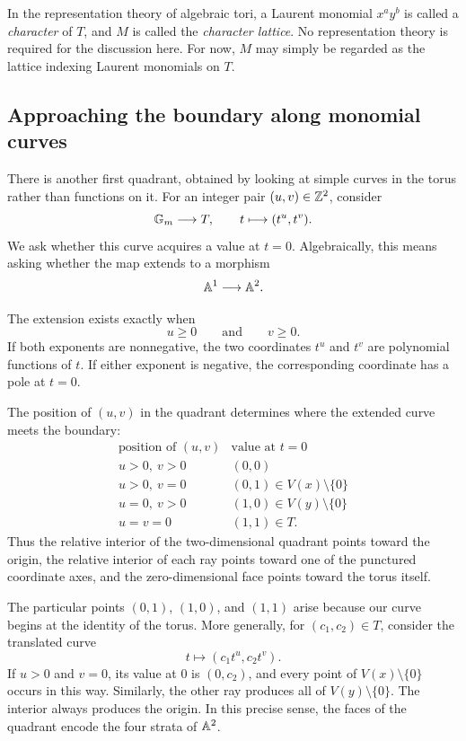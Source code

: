 \begin{observation}
In the representation theory of algebraic tori, a Laurent monomial
\(x^ay^b\) is called a \emph{character} of \(T\), and \(M\) is called
the \emph{character lattice}. No representation theory is required
for the discussion here. For now, \(M\) may simply be regarded as the
lattice indexing Laurent monomials on \(T\).
\end{observation}

\subsection{Approaching the boundary along monomial curves}

There is another first quadrant, obtained by looking at simple curves
in the torus rather than functions on it. For an integer pair
\((u,v)\in\mathbb{Z}^2\), consider
\[
\mathbb{G}_{m}\longrightarrow T,
\qquad
t\longmapsto(t^u,t^v).
\]
We ask whether this curve acquires a value at \(t=0\). Algebraically,
this means asking whether the map extends to a morphism
\[
\mathbb{A}^1\longrightarrow\mathbb{A}^2.
\]

The extension exists exactly when
\[
u\geq0
\qquad\text{and}\qquad
v\geq0.
\]
If both exponents are nonnegative, the two coordinates \(t^u\) and
\(t^v\) are polynomial functions of \(t\). If either exponent is
negative, the corresponding coordinate has a pole at \(t=0\).

The position of \((u,v)\) in the quadrant determines where the
extended curve meets the boundary:
\[
\begin{array}{c|c}
\text{position of }(u,v) & \text{value at }t=0\\
\hline
u>0,\ v>0 & (0,0)\\
u>0,\ v=0 & (0,1)\in V(x)\setminus\{0\}\\
u=0,\ v>0 & (1,0)\in V(y)\setminus\{0\}\\
u=v=0 & (1,1)\in T.
\end{array}
\]
Thus the relative interior of the two-dimensional quadrant points
toward the origin, the relative interior of each ray points toward
one of the punctured coordinate axes, and the zero-dimensional face
points toward the torus itself.

The particular points \((0,1)\), \((1,0)\), and \((1,1)\) arise
because our curve begins at the identity of the torus. More generally,
for \((c_1,c_2)\in T\), consider the translated curve
\[
t\longmapsto(c_1t^u,c_2t^v).
\]
If \(u>0\) and \(v=0\), its value at \(0\) is \((0,c_2)\), and every
point of \(V(x)\setminus\{0\}\) occurs in this way. Similarly, the
other ray produces all of \(V(y)\setminus\{0\}\). The interior always
produces the origin. In this precise sense, the faces of the quadrant
encode the four strata of \(\mathbb{A}^2\).

